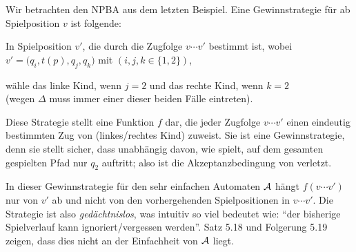 \documentclass[fontsize=11pt, twoside=false, numbers=autoenddot]{scrbook}
\begin{document}
Wir betrachten den NPBA \Amc aus dem letzten Beispiel.
Eine Gewinnstrategie für \PF ab Spielposition $v$ ist folgende:
%
\begin{center}
  \parbox{.8\linewidth}{%
    In Spielposition $v'$, die durch die Zugfolge $v\cdots v'$ bestimmt ist,
    wobei $v'=\big(q_i,t(p),q_j,q_k\big)$ mit $(i,j,k \in \{1,2\})$,
    \par\smallskip
    wähle das linke Kind, wenn $j=2$ und das rechte Kind, wenn $k=2$\\
    (wegen $\Delta$ muss immer einer dieser beiden Fälle eintreten).%
  }
\end{center}
%
Diese Strategie stellt eine Funktion $f$ dar, die jeder Zugfolge $v\cdots v'$
einen eindeutig bestimmten Zug von \PF (linkes/rechtes Kind) zuweist.
Sie ist eine Gewinnstrategie, denn sie stellt sicher, dass unabhängig davon, wie \AUT spielt,
auf dem gesamten gespielten Pfad nur $q_2$ auftritt; also ist die Akzeptanzbedingung
von \Amc verletzt.

\goodbreak
In dieser Gewinnstrategie für den sehr einfachen Automaten $\mathcal{A}$ hängt
$f(v\cdots v')$ nur von $v'$ ab und nicht von den vorhergehenden Spielpositionen
in $v\cdots v'$. Die Strategie ist also \emph{gedächtnislos},
was intuitiv so viel bedeutet wie: "`der bisherige Spielverlauf kann
ignoriert/vergessen werden"'.
Satz 5.18 und Folgerung 5.19 zeigen, dass dies nicht an der
Einfachheit von $\mathcal{A}$ liegt.

\goodbreak
%
%
\end{document}
